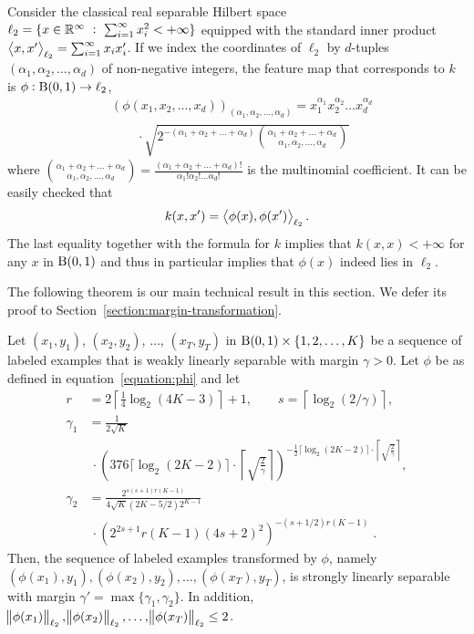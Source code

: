 Consider the classical real separable Hilbert space $\ell_2 = \{ x \in \mathbb{R}^\infty
~:~ \sum_{i=1}^\infty x_i^2 < + \infty \}$ equipped with the standard inner
product $\left\langle x, x' \right\rangle_{\ell_2} = \sum_{i=1}^\infty x_i x'_i$. If we index the
coordinates of $\ell_2$ by $d$-tuples $(\alpha_1, \alpha_2, \dots, \alpha_d)$ of
non-negative integers, the feature map that corresponds to $k$ is $\phi: \operatorname{B}(0,1)
\to \ell_2$,
\begin{align}
& \left(\phi(x_1, x_2, \dots, x_d)\right)_{(\alpha_1, \alpha_2, \dots, \alpha_d)} = x_1^{\alpha_1} x_2^{\alpha_2} \dots x_d^{\alpha_d} \nonumber \\
& \qquad \cdot \sqrt{2^{-(\alpha_1 + \alpha_2 + \dots + \alpha_d)} \binom{\alpha_1 + \alpha_2 + \dots + \alpha_d}{\alpha_1, \alpha_2, \dots, \alpha_d}}
\label{equation:phi}
\end{align}
where $\binom{\alpha_1 + \alpha_2 + \dots + \alpha_d}{\alpha_1, \alpha_2, \dots,
\alpha_d} = \frac{(\alpha_1 + \alpha_2 + \dots + \alpha_d)!}{\alpha_1! \alpha_2!
\dots \alpha_d!}$ is the multinomial coefficient. It can be easily checked that
$$
k(x,x') = \left\langle \phi(x), \phi(x') \right\rangle_{\ell_2}.
$$
The last equality together with the formula for $k$ implies that $k(x,x) <
+\infty$ for any $x$ in $\operatorname{B}(0,1)$ and thus in particular implies that $\phi(x)$
indeed lies in $\ell_2$.

The following theorem is our main technical result in this section. We defer its
proof to Section~\ref{section:margin-transformation}.

\begin{theorem}
\label{theorem:margin-transformation}
Let $(x_1, y_1)$, $(x_2, y_2)$, $\dots$, $(x_T, y_T)$ in $\operatorname{B}(0,1) \times
\{1,2,\dots,K\}$ be a sequence of labeled examples that is weakly linearly
separable with margin $\gamma > 0$. Let $\phi$ be as defined in
equation~\eqref{equation:phi} and let
\begingroup
\allowdisplaybreaks
\begin{align*}
r & = 2 \left\lceil \frac{1}{4} \log_2(4K-3) \right\rceil + 1, \quad \quad s = \left \lceil \log_2(2/\gamma) \right \rceil, \\
\gamma_1 & = \frac{1}{2\sqrt{K}}  \\
& \ \cdot \left(376 \lceil \log_2(2K-2) \rceil \cdot \left \lceil \sqrt{\frac{2}{\gamma}} \right \rceil \right)^{-\frac{1}{2} \lceil \log_2(2K-2) \rceil \cdot \left \lceil \sqrt{\frac{2}{\gamma}} \right \rceil}, \\
\gamma_2 & = \frac{2^{s(s+1)r(K-1)} }{4\sqrt{K}(2K-5/2) 2^{K-1}} \\
& \ \cdot \left(2^{2s+1} r(K-1) (4s+2)^2 \right)^{-(s+1/2)r(K-1)} \; .
\end{align*}
\endgroup
Then, the sequence of labeled examples transformed by $\phi$,
namely $(\phi(x_1), y_1), (\phi(x_2), y_2), \dots,
(\phi(x_T), y_T)$, is strongly linearly separable with margin $\gamma' =
\max\{\gamma_1, \gamma_2\}$. In addition, $\norm{\phi(x_1)}_{\ell_2},
\norm{\phi(x_2)}_{\ell_2}, \dots, \norm{\phi(x_T)}_{\ell_2} \le 2$.
\end{theorem}

